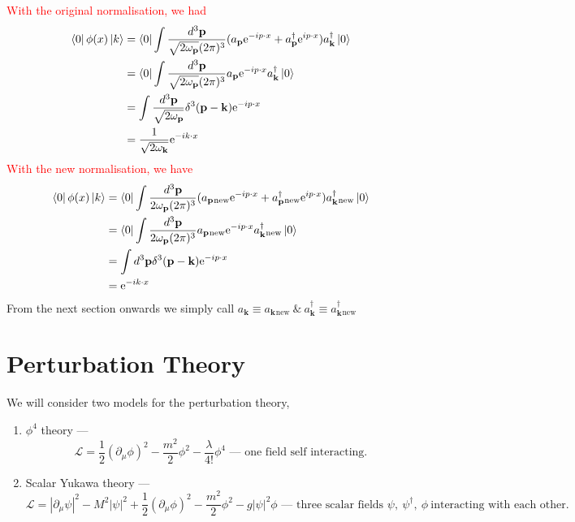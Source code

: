 \documentclass[11pt]{article}
\newcommand{\del}{\partial}
\newcommand{\e}{\mathrm{e}}
\newcommand{\w}{\omega}
\newcommand{\ld}{\mathcal{L}}
\renewcommand{\a}[1]{a_\mathbf{#1}}
\newcommand{\adag}[1]{a^\dagger_\mathbf{#1}}
\numberwithin{equation}{section}
\begin{document}
    \textcolor{red}{
        With the original normalisation, we had 
        \begin{align*}
            \bra{0} \phi(x)\ket{k} &= \bra{0}\int \frac{d^3\textbf{p}}{\sqrt{2\w_\textbf{p}}(2\pi)^3} (\a{p}\e^{-ip\cdot x} + \adag{p} \e^{ip\cdot x}) \adag{k} \ket{0}\\
            & = \bra{0}\int \frac{d^3\textbf{p}}{\sqrt{2\w_\textbf{p}}(2\pi)^3} \a{p}\e^{-ip\cdot x} \adag{k}\ket{0} \\
            & = \int \frac{d^3\textbf{p}}{\sqrt{2\w_\textbf{p}}} \delta^3(\textbf{p} - \textbf{k})\e^{-ip\cdot x}\\
            & = \frac{1}{\sqrt{2\w_\textbf{k}}}\e^{-ik\cdot x}
        \end{align*}
        With the new normalisation, we have 
        \begin{align*}
            \bra{0} \phi(x)\ket{k} &= \bra{0}\int \frac{d^3\textbf{p}}{2\w_\textbf{p}(2\pi)^3} (\a{p}{}_{\text{new}}\e^{-ip\cdot x} + \adag{p}{}_{\text{new}} \e^{ip\cdot x})\adag{k}{}_{\text{new}} \ket{0}\\
            & = \bra{0}\int \frac{d^3\textbf{p}}{2\w_\textbf{p}(2\pi)^3} \a{p}{}_{\text{new}}\e^{-ip\cdot x} \adag{k}{}_{\text{new}}\ket{0} \\
            & = \int d^3\textbf{p} \delta^3(\textbf{p} - \textbf{k})\e^{-ip\cdot x}\\
            & =\e^{-ik\cdot x}
        \end{align*}
    }
    From the next section onwards we simply call \(\a{k} \equiv \a{k}{}_{\text{new}}~\&~\adag{k} \equiv \adag{k}{}_{\text{new}}\)

    \newpage
    \section{Perturbation Theory}
    We will consider two models for the perturbation theory, \\
    \begin{enumerate}
        \item \(\phi^4\) theory — \begin{equation*}
            \ld = \frac{1}{2}(\del_\mu \phi)^2 - \frac{m^2}{2}\phi^2 - \frac{\lambda}{4!}\phi^4\text{   — one field self interacting.}
        \end{equation*}
        \item Scalar Yukawa theory — \begin{equation*}
            \ld = |\del_\mu \psi|^2 - M^2 |\psi|^2 + \frac{1}{2}(\del_\mu \phi)^2 - \frac{m^2}{2}\phi^2 - g|\psi|^2\phi \text{   — three scalar  fields } \psi,~\psi^\dagger,~\phi~\text{interacting with each other.} 
        \end{equation*}
    \end{enumerate}
\end{document}
